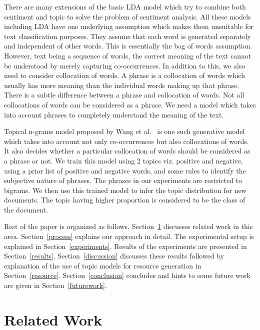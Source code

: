 \documentclass[11pt]{article}
\begin{document}
There are many extensions of the basic LDA model which try to combine both sentiment 
and topic to solve the problem of sentiment analysis. All these models including LDA 
have one underlying assumption which makes them unsuitable for text classification
purposes. They assume that each word is generated separately and independent of other 
words. This is essentially the bag of words assumption. However, text being a sequence 
of words, the correct meaning of the text cannot be understood by merely capturing
co-occurrences. In addition to this, we also need to consider collocation of words.
A phrase is a collocation of words which usually has more meaning than the individual
words making up that phrase. There is a subtle difference between a phrase and collocation
of words. Not all collocations of words can be considered as a phrase. We need a 
model which takes into account phrases to completely understand the meaning of the text.

Topical n-grams model proposed by Wang et al.~ is one such generative 
model which takes into account not only co-occurrences but also collocations of words. It 
also decides whether a particular collocation of words should be considered as a phrase or not. 
We train this model using 2 topics viz. positive and negative, using a prior list of positive 
and negative words, and some rules to identify the subjective nature of phrases. The phrases
in our experiments are restricted to bigrams. We then use this trained model to infer the topic
distribution for new documents. The topic having higher proportion is considered to be
the class of the document.

Rest of the paper is organized as follows. Section~\ref{survey} discusses related work
in this area. Section~\ref{process} explains our approach in detail. The experimental 
setup is explained in Section~\ref{experiments}. Results of the experiments are presented
in Section~\ref{results}. Section~\ref{discussion} discusses these results followed by
explanation of the use of topic models for resource generation in Section~\ref{resource}.
Section~\ref{conclusion} concludes and  hints to some future work are given in 
Section~\ref{futurework}.


\section{Related Work}\label{survey}
\end{document}
